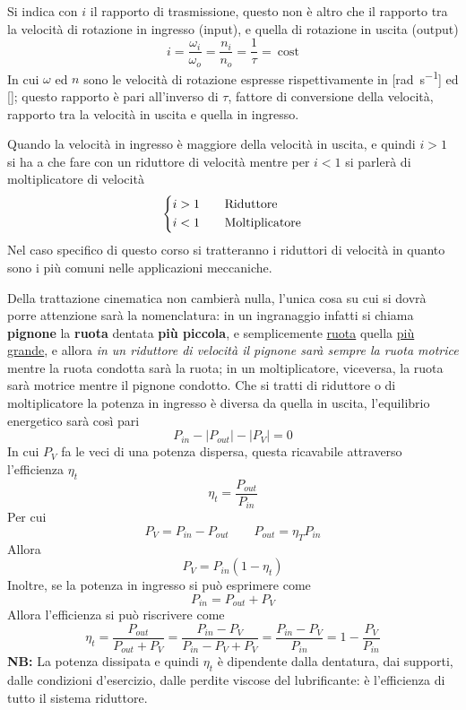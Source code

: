 \documentclass[a4paper, 15pt]{article}
\begin{document}
\begin{adjustwidth}{2in}{}
	Si indica con $i$ il rapporto di trasmissione, questo non è altro che il rapporto tra la velocità di rotazione in ingresso (input), e quella di rotazione in uscita (output)
	\[i = \dfrac{\omega_i}{\omega_o} = \dfrac{n_i}{n_o} = \dfrac{1}{\tau} = ~\text{cost}\] 
	In cui $\omega$ ed $n$ sono le velocità di rotazione espresse rispettivamente in [\si{\radian\per\second}] ed [\si{\rpm}]; questo rapporto è pari all'inverso di $\tau$, fattore di conversione della velocità, rapporto tra la velocità in uscita e quella in ingresso. \newline
	
	Quando la velocità in ingresso è maggiore della velocità in uscita, e quindi $i>1$ si ha a che fare con un riduttore di velocità mentre per $i<1$ si parlerà di moltiplicatore di velocità
	\[\begin{dcases}
		i>1 \qquad \text{Riduttore} \\
		i<1 \qquad \text{Moltiplicatore}
	\end{dcases}\] 
	Nel caso specifico di questo corso si tratteranno i riduttori di velocità in quanto sono i più comuni nelle applicazioni meccaniche.
	
	Della trattazione cinematica non cambierà nulla,  l'unica cosa su cui si dovrà porre attenzione sarà la nomenclatura: in un ingranaggio infatti si chiama \textbf{pignone} la \textbf{ruota} dentata \textbf{più piccola}, e semplicemente \underline{ruota} quella \underline{più grande}, e allora \textit{in un riduttore di velocità il pignone sarà sempre la ruota motrice} mentre la ruota condotta sarà la ruota; in un moltiplicatore, viceversa, la ruota sarà motrice mentre il pignone condotto. 
\newpage
	Che si tratti di riduttore o di moltiplicatore la potenza in ingresso è diversa da quella in uscita, l'equilibrio energetico sarà così pari 
	\[P_{in} - |P_{out}|  -  |P_V| = 0\]
	In cui $P_V$ fa le veci di una potenza dispersa, questa ricavabile attraverso l'efficienza $\eta_t$ 
	\[\eta_t = \dfrac{P_{out}}{P_{in}}\]
	Per cui 
	\[P_V = P_{in}-P_{out}\qquad P_{out} = \eta_T P_{in} \]
	Allora
	\[P_V = P_{in}(1-\eta_t)\]
	Inoltre, se la potenza in ingresso si può esprimere come
	\[P_{in}=P_{out} + P_V \] 
	Allora l'efficienza si può riscrivere come
	\[\eta_t = \dfrac{P_{out}}{P_{out} + P_V} = \dfrac{P_{in}-P_V}{P_{in}-P_V + P_V} = \dfrac{P_{in}-P_V}{P_{in}} = 1 - \dfrac{P_V}{P_{in}}\]
	\textbf{NB:} La potenza dissipata  e quindi $\eta_t$ è dipendente dalla dentatura, dai supporti, dalle condizioni
	d'esercizio, dalle perdite viscose del lubrificante: è l'efficienza di tutto il sistema riduttore. \newline
	

\end{adjustwidth}
\end{document}
